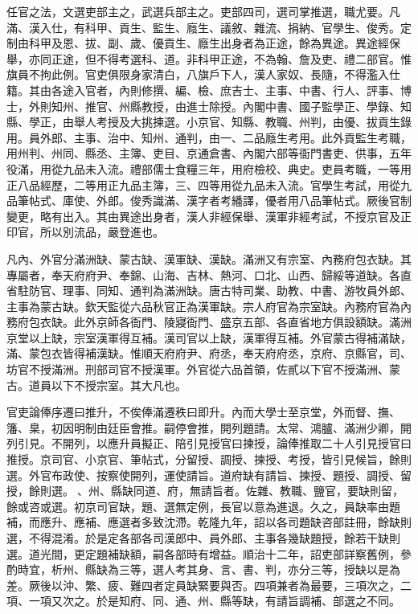 \begin{pinyinscope}
任官之法，文選吏部主之，武選兵部主之。吏部四司，選司掌推選，職尤要。凡滿、漢入仕，有科甲、貢生、監生、廕生、議敘、雜流、捐納、官學生、俊秀。定制由科甲及恩、拔、副、歲、優貢生、廕生出身者為正途，餘為異途。異途經保舉，亦同正途，但不得考選科、道。非科甲正途，不為翰、詹及吏、禮二部官。惟旗員不拘此例。官吏俱限身家清白，八旗戶下人，漢人家奴、長隨，不得濫入仕籍。其由各途入官者，內則修撰、編、檢、庶吉士、主事、中書、行人、評事、博士，外則知州、推官、州縣教授，由進士除授。內閣中書、國子監學正、學錄、知縣、學正，由舉人考授及大挑揀選。小京官、知縣、教職、州判，由優、拔貢生錄用。員外郎、主事、治中、知州、通判，由一、二品廕生考用。此外貢監生考職，用州判、州同、縣丞、主簿、吏目、京通倉書、內閣六部等衙門書吏、供事，五年役滿，用從九品未入流。禮部儒士食糧三年，用府檢校、典史。吏員考職，一等用正八品經歷，二等用正九品主簿，三、四等用從九品未入流。官學生考試，用從九品筆帖式、庫使、外郎。俊秀識滿、漢字者考繙譯，優者用八品筆帖式。厥後官制變更，略有出入。其由異途出身者，漢人非經保舉、漢軍非經考試，不授京官及正印官，所以別流品，嚴登進也。

凡內、外官分滿洲缺、蒙古缺、漢軍缺、漢缺。滿洲又有宗室、內務府包衣缺。其專屬者，奉天府府尹、奉錦、山海、吉林、熱河、口北、山西、歸綏等道缺。各直省駐防官、理事、同知、通判為滿洲缺。唐古特司業、助教、中書、游牧員外郎、主事為蒙古缺。欽天監從六品秋官正為漢軍缺。宗人府官為宗室缺。內務府官為內務府包衣缺。此外京師各衙門、陵寢衙門、盛京五部、各直省地方俱設額缺。滿洲京堂以上缺，宗室漢軍得互補。漢司官以上缺，漢軍得互補。外官蒙古得補滿缺，滿、蒙包衣皆得補漢缺。惟順天府府尹、府丞，奉天府府丞，京府、京縣官，司、坊官不授滿洲。刑部司官不授漢軍。外官從六品首領，佐貳以下官不授滿洲、蒙古。道員以下不授宗室。其大凡也。

官吏論俸序遷曰推升，不俟俸滿遷秩曰即升。內而大學士至京堂，外而督、撫、籓、臬，初因明制由廷臣會推。嗣停會推，開列題請。太常、鴻臚、滿洲少卿，開列引見。不開列，以應升員擬正、陪引見授官曰揀授，論俸推取二十人引見授官曰推授。京司官、小京官、筆帖式，分留授、調授、揀授、考授，皆引見候旨，餘則選。外官布政使、按察使開列，運使請旨。道府缺有請旨、揀授、題授、調授、留授，餘則選。、州、縣缺同道、府，無請旨者。佐雜、教職、鹽官，要缺則留，餘或咨或選。初京司官缺，題、選無定例，長官以意為進退。久之，員缺率由題補，而應升、應補、應選者多致沈滯。乾隆九年，詔以各司題缺咨部註冊，餘缺則選，不得混淆。於是定各部各司漢郎中、員外郎、主事各幾缺題授，餘若干缺則選。道光間，更定題補缺額，嗣各部時有增益。順治十二年，詔吏部詳察舊例，參酌時宜，析州、縣缺為三等，選人考其身、言、書、判，亦分三等，授缺以是為差。厥後以沖、繁、疲、難四者定員缺緊要與否。四項兼者為最要，三項次之，二項、一項又次之。於是知府、同、通、州、縣等缺，有請旨調補、部選之不同。


\end{pinyinscope}
